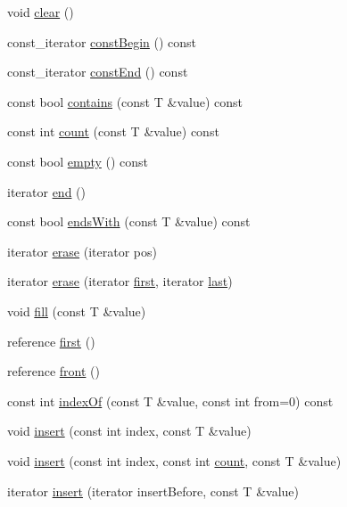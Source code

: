 \begin{DoxyCompactItemize}
\item 
void \hyperlink{namespaceprism_ad22144cb445517f69b2e6f76586cf75d}{clear} ()
\item 
const\+\_\+iterator \hyperlink{namespaceprism_a8f07ef2e7db05a23c631dee99ad4eba3}{const\+Begin} () const 
\item 
const\+\_\+iterator \hyperlink{namespaceprism_a61b5e8524d7d3106a0b01cd002af8f75}{const\+End} () const 
\item 
const bool \hyperlink{namespaceprism_aec550341cf4587d3a0afaa9492e77503}{contains} (const T \&value) const 
\item 
const int \hyperlink{namespaceprism_a02873ae9088199948854cc05b20831c5}{count} (const T \&value) const 
\item 
const bool \hyperlink{namespaceprism_a7441180af2d914cc54ac35aead6ed030}{empty} () const 
\item 
iterator \hyperlink{namespaceprism_a8976ba2aea6612a03f75a390f40daef8}{end} ()
\item 
const bool \hyperlink{namespaceprism_abfc42fa48a8be97e541b137e9ae83c18}{ends\+With} (const T \&value) const 
\item 
iterator \hyperlink{namespaceprism_a46f69cc5e78e0a7bcd2d9a7ed9c05a8b}{erase} (iterator pos)
\item 
iterator \hyperlink{namespaceprism_ab853ba84b4ed547730d02a8c21328e65}{erase} (iterator \hyperlink{namespaceprism_ae3fb7a1926a9e8e59300cd5e370470da}{first}, iterator \hyperlink{namespaceprism_abe4956c4e865f55ca126b7fb973b5078}{last})
\item 
void \hyperlink{namespaceprism_ab76b40745e46fbda01eb55d8258ff498}{fill} (const T \&value)
\item 
reference \hyperlink{namespaceprism_ae3fb7a1926a9e8e59300cd5e370470da}{first} ()
\item 
reference \hyperlink{namespaceprism_a0c27e6535264895614b87eefa337404d}{front} ()
\item 
const int \hyperlink{namespaceprism_a78b6d3259343e632ab4e9d806498ac92}{index\+Of} (const T \&value, const int from=0) const 
\item 
void \hyperlink{namespaceprism_af52510a241330236aa7202abf65c6dcb}{insert} (const int index, const T \&value)
\item 
void \hyperlink{namespaceprism_abd912a072952b08ebd1009abbede3ee5}{insert} (const int index, const int \hyperlink{namespaceprism_a024117fc3639cdf6598509edf22f034a}{count}, const T \&value)
\item 
iterator \hyperlink{namespaceprism_a391f88be142a74df98c77632bb8352af}{insert} (iterator insert\+Before, const T \&value)

\end{DoxyCompactItemize}
